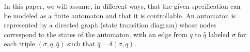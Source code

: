 \documentclass[letterpaper, 10 pt, conference]{ieeeconf}
\begin{document}
In this paper, we will assume, in different ways, that the given specification can be modeled as a finite automaton and that it is controllable. 
An automaton is represented by a directed graph (state transition diagram) whose nodes correspond to the states of the automaton, with an edge from $q$ to $\widehat{q}$ labeled $\sigma$ for each triple $(\sigma, q, \widehat{q})$ such that $\widehat{q}=\delta(\sigma, q)$. %
\end{document}
